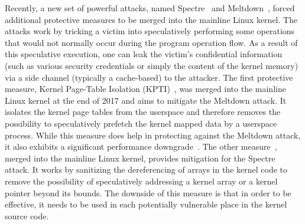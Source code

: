Recently, a new set of powerful attacks, named Spectre~\cite{Kocher2018spectre} and Meltdown~\cite{Lipp2018meltdown}, forced additional protective measures to be merged into the mainline Linux kernel. The attacks work by tricking a victim into speculatively performing some operations that would not normally occur during the program operation flow. As a result of this speculative execution, one can leak the victim's confidential information (such as various security credentials or simply the content of the kernel memory) via a side channel (typically a cache-based) to the attacker. The first protective measure, Kernel Page-Table Isolation (KPTI)~\cite{kpti}, was merged into the mainline Linux kernel at the end of 2017 and aims to mitigate the Meltdown attack. It isolates the kernel page tables from the userspace and therefore removes the possibility to speculatively prefetch the kernel mapped data by a userspace process. While this measure does help in protecting against the Meltdown attack, it also exhibits a significant performance downgrade~\cite{kptiperf}. The other measure~\cite{variant1}, merged into the mainline Linux kernel, provides mitigation for the Spectre attack. It works by sanitizing the dereferencing of arrays in the kernel code to remove the possibility of speculatively addressing a kernel array or a kernel pointer beyond its bounds. The downside of this measure is that in order to be effective, it needs to be used in each potentially vulnerable place in the kernel source code.     
